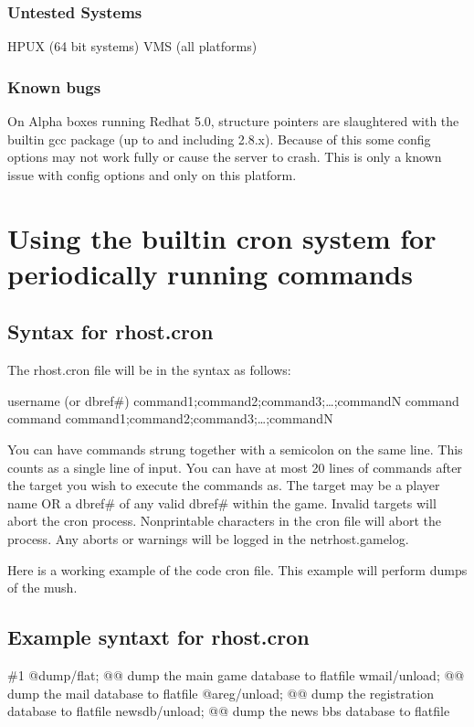\documentclass[letterpaper,10pt,english]{sphinxmanual}
\begin{document}
\subsection{Untested Systems}
\label{\detokenize{29-setup:untested-systems}}
\sphinxAtStartPar
HP\sphinxhyphen{}UX (64 bit systems)
VMS (all platforms)


\subsection{Known bugs}
\label{\detokenize{29-setup:known-bugs}}
\sphinxAtStartPar
On Alpha boxes running Redhat 5.0, structure pointers are slaughtered with
the built\sphinxhyphen{}in gcc package (up to and including 2.8.x).  Because of this some
config options may not work fully or cause the server to crash.  This is only
a known issue with config options and only on this platform.


\chapter{Using the built\sphinxhyphen{}in cron system for periodically running commands}
\label{\detokenize{30-cron:using-the-built-in-cron-system-for-periodically-running-commands}}\label{\detokenize{30-cron::doc}}

\section{Syntax for rhost.cron}
\label{\detokenize{30-cron:syntax-for-rhost-cron}}
\sphinxAtStartPar
The rhost.cron file will be in the syntax as follows:

\sphinxAtStartPar
username (or dbref\#)
command1;command2;command3;…;commandN
command
command
command1;command2;command3;…;commandN

\sphinxAtStartPar
You can have commands strung together with a semicolon
on the same line.  This counts as a single line of input.
You can have at most 20 lines of commands after the target
you wish to execute the commands as.  The target may
be a player name OR a dbref\# of any valid dbref\# within
the game.  Invalid targets will abort the cron process.
Non\sphinxhyphen{}printable characters in the cron file will abort
the process.  Any aborts or warnings will be logged
in the netrhost.gamelog.

\sphinxAtStartPar
Here is a working example of the code cron file.
This example will perform dumps of the mush.


\section{Example syntaxt for rhost.cron}
\label{\detokenize{30-cron:example-syntaxt-for-rhost-cron}}
\sphinxAtStartPar
\#1
@dump/flat; @@ dump the main game database to flatfile
wmail/unload; @@ dump the mail database to flatfile
@areg/unload; @@ dump the registration database to flatfile
newsdb/unload; @@ dump the news bbs database to flatfile
\end{document}
